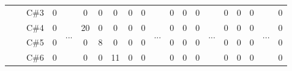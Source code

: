 \documentclass[12pt]{article}
\begin{document}
\begin{table}[H]
{\begin{tabular}{clcccccccccccccccccc}
					   & \multicolumn{1}{l|}{} & \multicolumn{1}{c|}{C\#3} & \multicolumn{1}{c|}{0}    & \multicolumn{1}{c|}{\multirow{5}{*}{...}} & \multicolumn{1}{c|}{0}    & \multicolumn{1}{c|}{0}    & \multicolumn{1}{c|}{0}    & \multicolumn{1}{c|}{0}    & \multicolumn{1}{c|}{0}  & \multicolumn{1}{c|}{\multirow{5}{*}{...}} & \multicolumn{1}{c|}{0}    & \multicolumn{1}{c|}{0}    & \multicolumn{1}{c|}{0}    & \multicolumn{1}{c|}{\multirow{5}{*}{...}} & \multicolumn{1}{c|}{0}  & \multicolumn{1}{c|}{0}  & \multicolumn{1}{c|}{0}  & \multicolumn{1}{c|}{\multirow{5}{*}{...}} & \multicolumn{1}{c|}{0}  \\ \cline{3-4} \cline{6-10} \cline{12-14} \cline{16-18} \cline{20-20} 
					   & \multicolumn{1}{l|}{} & \multicolumn{1}{c|}{C\#4} & \multicolumn{1}{c|}{0}    & \multicolumn{1}{c|}{}                     & \multicolumn{1}{c|}{20}   & \multicolumn{1}{c|}{0}    & \multicolumn{1}{c|}{0}    & \multicolumn{1}{c|}{0}    & \multicolumn{1}{c|}{0}  & \multicolumn{1}{c|}{}                     & \multicolumn{1}{c|}{0}    & \multicolumn{1}{c|}{0}    & \multicolumn{1}{c|}{0}    & \multicolumn{1}{c|}{}                     & \multicolumn{1}{c|}{0}  & \multicolumn{1}{c|}{0}  & \multicolumn{1}{c|}{0}  & \multicolumn{1}{c|}{}                     & \multicolumn{1}{c|}{0}  \\ \cline{3-4} \cline{6-10} \cline{12-14} \cline{16-18} \cline{20-20} 
					   & \multicolumn{1}{l|}{} & \multicolumn{1}{c|}{C\#5} & \multicolumn{1}{c|}{0}    & \multicolumn{1}{c|}{}                     & \multicolumn{1}{c|}{0}    & \multicolumn{1}{c|}{8}    & \multicolumn{1}{c|}{0}    & \multicolumn{1}{c|}{0}    & \multicolumn{1}{c|}{0}  & \multicolumn{1}{c|}{}                     & \multicolumn{1}{c|}{0}    & \multicolumn{1}{c|}{0}    & \multicolumn{1}{c|}{0}    & \multicolumn{1}{c|}{}                     & \multicolumn{1}{c|}{0}  & \multicolumn{1}{c|}{0}  & \multicolumn{1}{c|}{0}  & \multicolumn{1}{c|}{}                     & \multicolumn{1}{c|}{0}  \\ \cline{3-4} \cline{6-10} \cline{12-14} \cline{16-18} \cline{20-20} 
					   & \multicolumn{1}{l|}{} & \multicolumn{1}{c|}{C\#6} & \multicolumn{1}{c|}{0}    & \multicolumn{1}{c|}{}                     & \multicolumn{1}{c|}{0}    & \multicolumn{1}{c|}{0}    & \multicolumn{1}{c|}{11}   & \multicolumn{1}{c|}{0}    & \multicolumn{1}{c|}{0}  & \multicolumn{1}{c|}{}                     & \multicolumn{1}{c|}{0}    & \multicolumn{1}{c|}{0}    & \multicolumn{1}{c|}{0}    & \multicolumn{1}{c|}{}                     & \multicolumn{1}{c|}{0}  & \multicolumn{1}{c|}{0}  & \multicolumn{1}{c|}{0}  & \multicolumn{1}{c|}{}                     & \multicolumn{1}{c|}{0}  \\ \cline{3-4} \cline{6-10} \cline{12-14} \cline{16-18} \cline{20-20} 

\end{tabular}}
\end{table}
\end{document}

